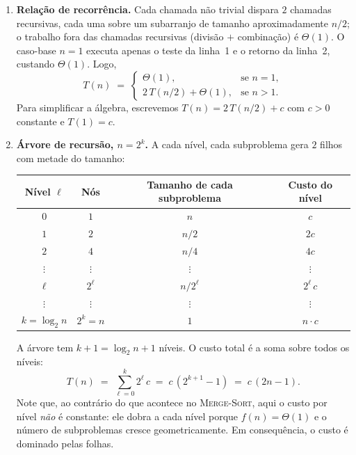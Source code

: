 \documentclass[9pt,a4paper]{extarticle}
\begin{document}
\begin{itemize}
\begin{enumerate}[label=(\alph*)]
    \item \textbf{Relação de recorrência.} Cada chamada não trivial dispara $2$ chamadas recursivas, cada uma sobre um subarranjo de tamanho aproximadamente $n/2$; o trabalho fora das chamadas recursivas (divisão $+$ combinação) é $\Theta(1)$. O caso-base $n = 1$ executa apenas o teste da linha~1 e o retorno da linha~2, custando $\Theta(1)$. Logo,
    \[
        T(n) \;=\;
        \begin{cases}
            \Theta(1), & \text{se } n = 1, \\[2pt]
            2\,T(n/2) + \Theta(1), & \text{se } n > 1.
        \end{cases}
    \]
    Para simplificar a álgebra, escrevemos $T(n) = 2\,T(n/2) + c$ com $c > 0$ constante e $T(1) = c$.

    \item \textbf{\textcolor{laranja}{Árvore de recursão, $n = 2^k$.}} A cada nível, cada subproblema gera $2$ filhos com metade do tamanho:

    \begin{center}
    \renewcommand{\arraystretch}{1.2}
    \begin{tabular}{@{}cccc@{}}
        \toprule
        \textbf{Nível $\ell$} & \textbf{Nós} & \textbf{Tamanho de cada subproblema} & \textbf{Custo do nível} \\
        \midrule
        $0$        & $1$            & $n$       & $c$            \\
        $1$        & $2$            & $n/2$     & $2c$           \\
        $2$        & $4$            & $n/4$     & $4c$           \\
        $\vdots$   & $\vdots$       & $\vdots$  & $\vdots$       \\
        $\ell$     & $2^\ell$       & $n/2^\ell$ & $2^\ell\, c$   \\
        $\vdots$   & $\vdots$       & $\vdots$  & $\vdots$       \\
        $k = \log_2 n$ & $2^k = n$  & $1$       & $n \cdot c$    \\
        \bottomrule
    \end{tabular}
    \end{center}

    A árvore tem $k + 1 = \log_2 n + 1$ níveis. O custo total é a soma sobre todos os níveis:
    \[
        T(n) \;=\; \sum_{\ell=0}^{k} 2^\ell\, c \;=\; c\,(2^{k+1} - 1) \;=\; c\,(2n - 1).
    \]
    Note que, ao contrário do que acontece no \textsc{Merge-Sort}, aqui o custo por nível \emph{não} é constante: ele dobra a cada nível porque $f(n) = \Theta(1)$ e o número de subproblemas cresce geometricamente. Em consequência, o custo é dominado pelas folhas.


\end{enumerate}
\end{itemize}
\end{document}
